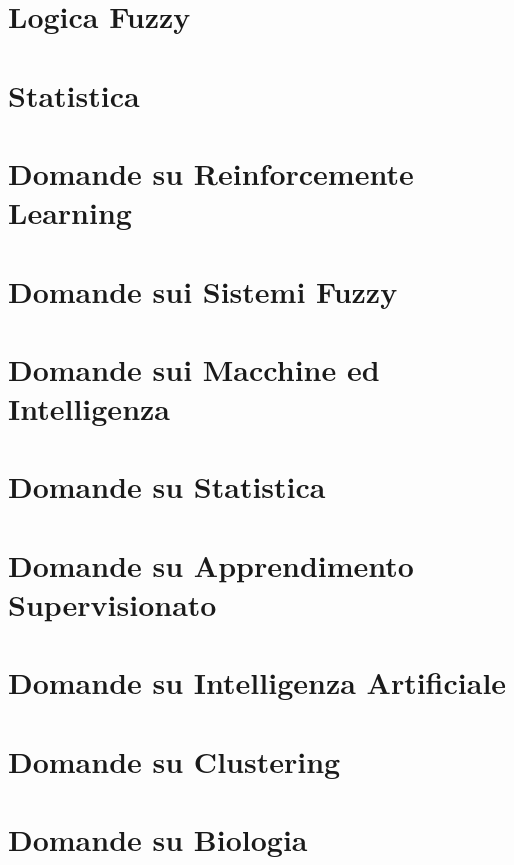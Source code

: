 \providecommand{\main}{.}








{\hypersetup{hidelinks}
	\tableofcontents  %
}

\chapter{Logica Fuzzy}


\chapter{Statistica}


\appendix
\chapter{Domande su Reinforcemente Learning}


\chapter{Domande sui Sistemi Fuzzy}


\chapter{Domande sui Macchine ed Intelligenza}


\chapter{Domande su Statistica}


\chapter{Domande su Apprendimento Supervisionato}


\chapter{Domande su Intelligenza Artificiale}


\chapter{Domande su Clustering}


\chapter{Domande su Biologia}




